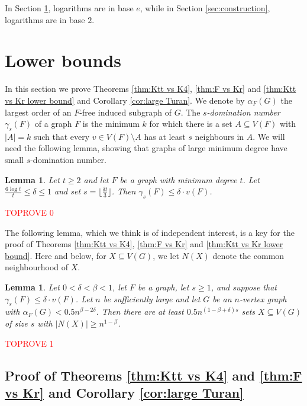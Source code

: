 \documentclass[11pt]{article}
\let\oldendproof\endproof
\renewenvironment{proof}[1][\proofname]{\oldproof[\bf #1]}{\oldendproof}
\theoremstyle{plain}
\newtheorem{lemma}[theorem]{Lemma}
\theoremstyle{definition}
\begin{document}
In Section \ref{sec:Ktt-free}, logarithms are in base $e$, while in Section \ref{sec:construction}, logarithms are in base $2$.

\section{Lower bounds}\label{sec:Ktt-free}
In this section we prove Theorems \ref{thm:Ktt vs K4}, \ref{thm:F vs Kr} and \ref{thm:Ktt vs Kr lower bound} and Corollary \ref{cor:large Turan}.
We denote by $\alpha_F(G)$ the largest order of an $F$-free induced subgraph of $G$.
The {\em $s$-domination number} $\gamma_s(F)$ of a graph $F$ is the minimum $k$ for which there is a set $A \subseteq V(F)$ with $|A| = k$ such that every $v \in V(F) \setminus A$ has at least $s$ neighbours in $A$. We will need the following lemma, showing that graphs of large minimum degree have small $s$-domination number.
\begin{lemma}\label{lem:domination}
Let $t\geq 2$ and let $F$ be a graph with minimum degree $t$. Let $\frac{6\log t}{t} \leq \delta \leq 1$ and set $s = \lfloor \frac{\delta t}{3} \rfloor$. Then $\gamma_s(F) \leq \delta \cdot v(F)$. 
\end{lemma}
\begin{proof}\textcolor{red}{TOPROVE 0}\end{proof}


The following lemma, which we think is of independent interest, is a key for the proof of Theorems \ref{thm:Ktt vs K4}, \ref{thm:F vs Kr} and \ref{thm:Ktt vs Kr lower bound}. Here and below, for $X \subseteq V(G)$, we let $N(X)$ denote the common neighbourhood of $X$. 
\begin{lemma}\label{claim:sampling}
		Let $0<\delta<\beta<1$, let $F$ be a graph, let $s \geq 1$, and
        suppose that $\gamma_s(F) \leq \delta \cdot v(F)$.
		Let $n$ be sufficiently large and let $G$ be an $n$-vertex graph with $\alpha_F(G) < 0.5n^{\beta-2\delta}$. Then there are at least $0.5 n^{(1-\beta+\delta)s}$ sets $X\subseteq V(G)$ of size $s$ with $|N(X)|\geq n^{1-\beta}$. 
\end{lemma}
\begin{proof}\textcolor{red}{TOPROVE 1}\end{proof}

\subsection{Proof of Theorems \ref{thm:Ktt vs K4} and \ref{thm:F vs Kr} and Corollary \ref{cor:large Turan}}
\end{document}
